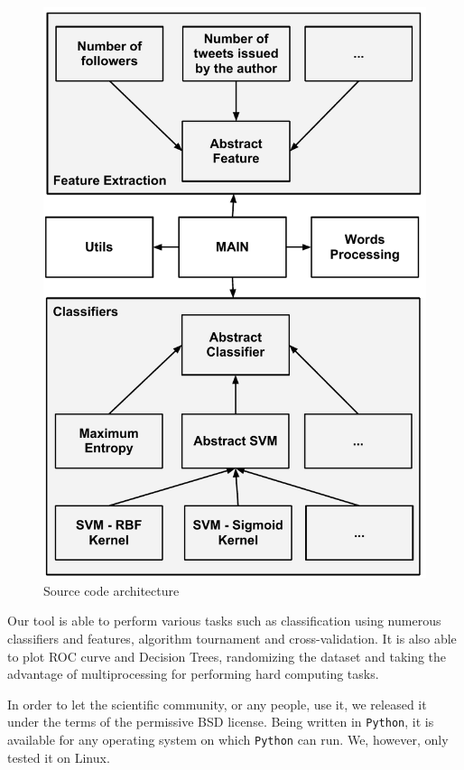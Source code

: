 \begin{figure}[!h]
\centering
 \includegraphics[width=0.9\columnwidth]{img/architecture.pdf}
\caption{Source code architecture}
\label{fig:architecture}
\end{figure}

Our tool is able to perform various tasks such as classification using numerous 
classifiers and features, algorithm tournament and cross-validation. It is also 
able to plot ROC curve and Decision Trees, randomizing the dataset and taking 
the advantage of multiprocessing for performing hard computing tasks.

In order to let the scientific community, or any people, use it, we released it 
under the terms of the permissive BSD license. Being written in \verb|Python|, 
it is available for any operating system on which \verb|Python| can run. We, 
however, only tested it on Linux.
